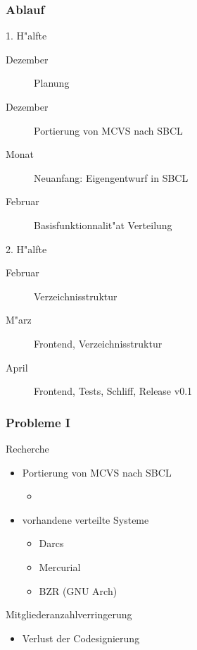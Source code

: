 \documentclass[german, presentation]{beamer}
\begin{document}
\begin{frame} \frametitle{Ablauf}
  \begin{block}{1. H"alfte}
    \begin{description}
    \item[Dezember] Planung
    \item[Dezember] Portierung von MCVS nach SBCL
    \item[Monat] Neuanfang: Eigengentwurf in SBCL
    \item[Februar] Basisfunktionnalit"at Verteilung
    \end{description}
  \end{block}
  \begin{block}{2. H"alfte}
    \begin{description}
    \item[Februar] Verzeichnisstruktur
    \item[M"arz] Frontend, Verzeichnisstruktur
    \item[April] Frontend, Tests, Schliff, Release v0.1
    \end{description}
  \end{block}
\end{frame}

\begin{frame} \frametitle{Probleme I}
  \begin{block}{Recherche}
    \begin{itemize}
    \item Portierung von MCVS nach SBCL
      \begin{itemize}
      \item 
      \end{itemize}
    \item vorhandene verteilte Systeme
      \begin{itemize}
      \item Darcs
      \item Mercurial
      \item BZR (GNU Arch)
      \end{itemize}
    \end{itemize}
  \end{block}
  \begin{block}{Mitgliederanzahlverringerung}
    \begin{itemize}
    \item Verlust der Codesignierung
    \end{itemize}
  \end{block}
\end{frame}
\end{document}
